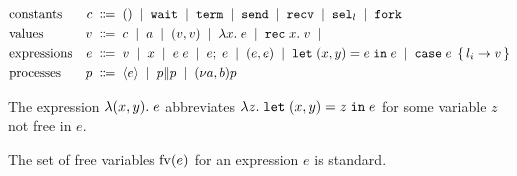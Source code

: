\begin{align*}
  &\text{constants}&
                     c \grmdef & \EUnit \grmor \EkwWait \grmor \EkwTerm \grmor \EkwSend \grmor \EkwRecv \grmor \EkwSelect[l] \grmor \EkwFork \\
  &\text{values}&
                   v \grmdef&
    c                        \grmor
    a                        \grmor
    (v, v)                   \grmor
    \ELam x e                \grmor
    \ERec x v                \grmor
  \\
  &\text{expressions}&
                       e \grmdef&
    v                       \grmor
    x                       \grmor
    e \; e                  \grmor
    \ELetU e e              \grmor
    (e, e)                  \grmor
    \ELetP x y e e          \grmor
         \ECase e { l_i \rightarrow v }
  \\
  & \text{processes}&
  p \grmdef&
    \PExp e                 \grmor
    \PPar p p               \grmor
    \PScope p
\end{align*}

The expression $\lambda (x,y).\; e$ abbreviates $\lambda z.\; \mathtt{let}\; (x,y) = z \;\mathtt{in}\; e$
for some variable $z$ not free in $e$.

The set of free variables $\mathrm{fv}(e)$ for an expression $e$ is standard.


